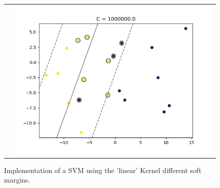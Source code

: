 \documentclass{beamer}
\begin{document}
\begin{frame}{}
\begin{figure}
\begin{tabular}{ll}
    		&
    		\includegraphics[scale=0.25]{img/SlackSVM04.png}
    	\end{tabular}
		\caption{Implementation of a SVM using the 'linear' Kernel different soft margins.}
		\label{fig:slacksvm}
	\end{figure}
\end{frame}
\end{document}
